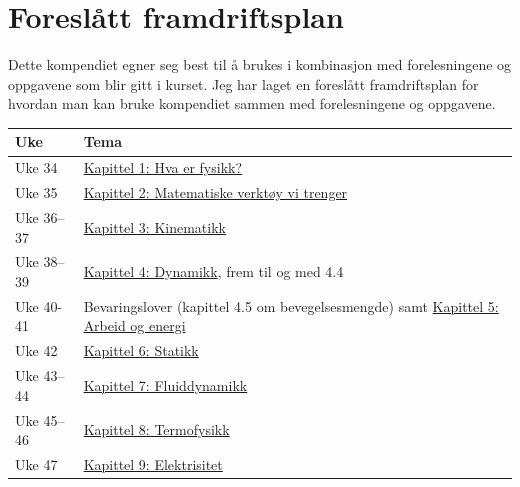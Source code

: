 \documentclass[../Main.tex]{subfiles}
\begin{document}
\section*{Foreslått framdriftsplan}
Dette kompendiet egner seg best til å brukes i kombinasjon med forelesningene og oppgavene som blir gitt i kurset. Jeg har laget en foreslått framdriftsplan for hvordan man kan bruke kompendiet sammen med forelesningene og oppgavene.
\begin{center}
\begin{tabular}{ll}
\hline
\textbf{Uke} & \textbf{Tema} \\
\hline
Uke 34 & \hyperref[Chapter:hvaerfysikk]{Kapittel 1: Hva er fysikk?} \\
Uke 35 & \hyperref[Chapter:matematikk]{Kapittel 2: Matematiske verktøy vi trenger} \\
Uke 36–37 & \hyperref[Chapter:kinematikk]{Kapittel 3: Kinematikk} \\
Uke 38–39 & \hyperref[Chapter:dynamikk]{Kapittel 4: Dynamikk}, frem til og med 4.4 \\
Uke 40-41 & Bevaringslover (kapittel 4.5 om bevegelsesmengde) samt \hyperref[Chapter:energi]{Kapittel 5: Arbeid og energi} \\
Uke 42 & \hyperref[Chapter:statikk]{Kapittel 6: Statikk} \\
Uke 43–44 & \hyperref[Chapter:fluiddynamikk]{Kapittel 7: Fluiddynamikk} \\
Uke 45–46 & \hyperref[Chapter:termofysikk]{Kapittel 8: Termofysikk} \\
Uke 47 & \hyperref[Chapter:elektrisitet]{Kapittel 9: Elektrisitet} \\
\hline
\end{tabular}
\end{center}
\end{document}
